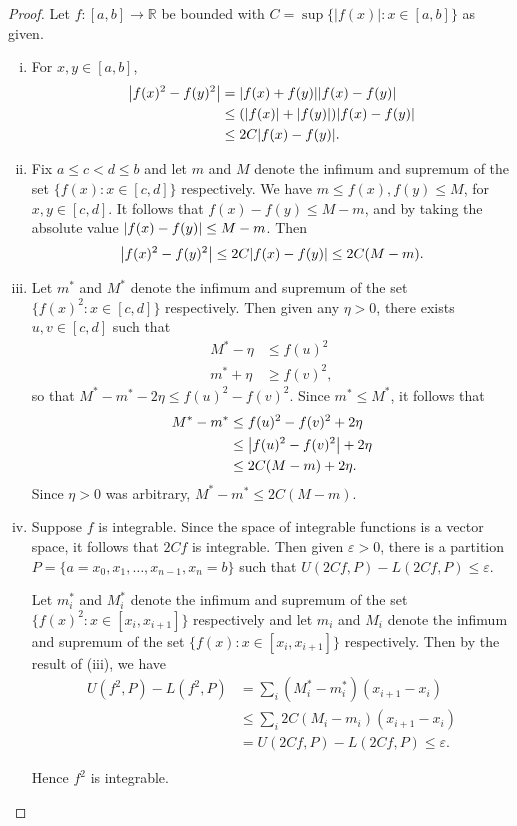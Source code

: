 \documentclass[12pt]{amsart}
\begin{document}
\begin{proof} Let $f\colon [a,b]\to \mathbb{R}$ be bounded with $C = \sup\{|f(x)|: x\in [a,b]\}$ as given. 
\begin{enumerate}[(i)]
    \item For $x,y\in [a,b]$, \begin{align*}
        \abs{f(x)^2 - f(y)^2} &= \abs{f(x)+f(y)}\abs{f(x)-f(y)}\\
        &\leq (\abs{f(x)} + \abs{f(y)})\abs{f(x)-f(y)}\\
        &\leq 2C\abs{f(x)-f(y)}.
    \end{align*}
    \item Fix $a\le c<d \le b$ and let $m$ and $M$ denote the infimum and supremum of the set $\{f(x): x\in [c,d]\}$ respectively. We have $m\leq f(x), f(y) \leq M$, for $x,y\in [c,d]$. It follows that $f(x) - f(y) \leq M - m$, and by taking the absolute value $\abs{f(x) - f(y)}\leq M-m$. Then \[\abs{f(x)^2 - f(y)^2} \leq 2C\abs{f(x)-f(y)} \leq 2C(M-m).\]
    \item Let $m^*$ and $M^*$ denote the infimum and supremum
    of the set $\{f(x)^2: x\in [c,d]\}$ respectively. Then given any $\eta > 0$, there exists $u,v\in [c,d]$ such that \begin{align*}
        M^{\ast} - \eta &\leq f(u)^2\\
        m^{\ast} + \eta &\geq f(v)^2,
    \end{align*} so that $M^{\ast} - m^{\ast} - 2\eta \leq f(u)^2 - f(v)^2$. Since $m^{\ast}\leq M^{\ast}$, it follows that \begin{align*}
        M^{\ast} - m^{\ast} &\leq f(u)^2 - f(v)^2 + 2\eta\\
        &\leq \abs{f(u)^2 - f(v)^2} + 2\eta\\
        &\leq 2C(M-m) + 2\eta.
    \end{align*} Since $\eta>0$ was arbitrary, $M^{\ast} - m^{\ast}\leq 2C(M-m)$.
    \item Suppose $f$ is integrable. Since the space of integrable functions is a vector space, it follows that $2Cf$ is integrable. Then given $\varepsilon>0$, there is a partition $P = \{a = x_0, x_1, \dots, x_{n-1}, x_n = b\}$ such that $U(2Cf, P) - L(2Cf, P)\leq \varepsilon$.
    
    Let $m_i^*$ and $M_i^*$ denote the infimum and supremum
    of the set $\{f(x)^2: x\in [x_i,x_{i+1}]\}$ respectively and let $m_i$ and $M_i$ denote the infimum and supremum of the set $\{f(x): x\in [x_i,x_{i+1}]\}$ respectively. Then by the result of (iii), we have \begin{align*}
        U(f^2, P) - L(f^2,P) &= \sum_i (M^{\ast}_i - m^{\ast}_i)(x_{i+1} - x_i)\\
        &\leq \sum_i 2C(M_i-m_i)(x_{i+1} - x_i)\\
        &= U(2Cf, P) - L(2Cf, P)\leq \varepsilon.
    \end{align*}

    Hence $f^2$ is integrable.
    \end{enumerate}
\end{proof}
\end{document}
